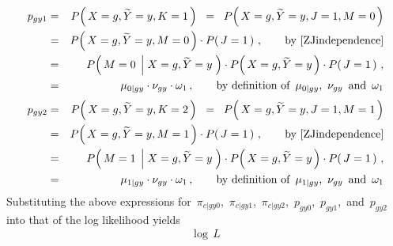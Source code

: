 \begin{enumerate}
\begin{eqnarray*}
\end{eqnarray*}
\begin{eqnarray*}
p_{gy1}
&=&
	P\!\left(\,X=g,\widetilde{Y}=y,K=1\,\right)
\;\;=\;\;
	P\!\left(\,X=g,\widetilde{Y}=y,J=1,M=0\,\right)
\\
&=&
	P\!\left(\,X=g,\widetilde{Y}=y,M=0\,\right)
	\cdot
	P\!\left(\,J=1\,\right)\,,
	\quad\quad
	\textnormal{by \eqref{ZJindependence}}
\\
&=&
	P\!\left(\,M=0\;\left\vert\;X=g,\widetilde{Y}=y\right.\,\right)
	\cdot
	P\!\left(\,X=g,\widetilde{Y}=y\,\right)
	\cdot
	P\!\left(\,J=1\,\right)\,,
\\
&=&
	\mu_{0 \vert gy}
	\cdot
	\nu_{gy}
	\cdot
	\omega_{1}\,,
	\quad\quad
	\textnormal{by definition of \,$\mu_{0 \vert gy}$, \,$\nu_{gy}$\, and \,$\omega_{1}$}
\end{eqnarray*}
\begin{eqnarray*}
p_{gy2}
&=&
	P\!\left(\,X=g,\widetilde{Y}=y,K=2\,\right)
\;\;=\;\;
	P\!\left(\,X=g,\widetilde{Y}=y,J=1,M=1\,\right)
\\
&=&
	P\!\left(\,X=g,\widetilde{Y}=y,M=1\,\right)
	\cdot
	P\!\left(\,J=1\,\right)\,,
	\quad\quad
	\textnormal{by \eqref{ZJindependence}}
\\
&=&
	P\!\left(\,M=1\;\left\vert\;X=g,\widetilde{Y}=y\right.\,\right)
	\cdot
	P\!\left(\,X=g,\widetilde{Y}=y\,\right)
	\cdot
	P\!\left(\,J=1\,\right)\,,
\\
&=&
	\mu_{1 \vert gy}
	\cdot
	\nu_{gy}
	\cdot
	\omega_{1}\,,
	\quad\quad
	\textnormal{by definition of \,$\mu_{1 \vert gy}$, \,$\nu_{gy}$\, and \,$\omega_{1}$}
\end{eqnarray*}
Substituting the above expressions for
\,$\pi_{c \vert gy0}$,
\,$\pi_{c \vert gy1}$,
\,$\pi_{c \vert gy2}$,
\,$p_{gy0}$,
\,$p_{gy1}$,
\,and
\,$p_{gy2}$
\,into that of the log likelihood yields
\begin{eqnarray*}
\log\,L

\end{eqnarray*}
\end{enumerate}
